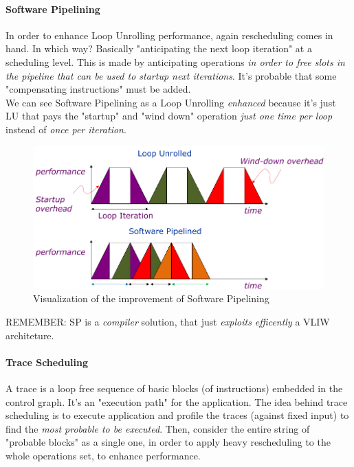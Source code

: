 \documentclass[10pt,a4paper]{article}
\begin{document}
					\paragraph{Software Pipelining}
						In order to enhance Loop Unrolling performance, again rescheduling comes in hand. In which way? Basically "anticipating the next loop iteration" at a scheduling level. This is made by anticipating operations \emph{in order to free slots in the pipeline that can be used to startup next iterations}. It's probable that some "compensating instructions" must be added.\\
						We can see Software Pipelining as a Loop Unrolling \emph{enhanced} because it's just LU that pays the "startup" and "wind down" operation \emph{just one time per loop} instead of \emph{once per iteration}.
						\begin{figure}[H]
							\centering
							\includegraphics[width = \textwidth]{./images/swpipe.png}
							\caption{Visualization of the improvement of Software Pipelining}
						\end{figure}
						REMEMBER: SP is a \emph{compiler} solution, that just \emph{exploits efficently} a VLIW architeture.
					
					\paragraph{Trace Scheduling}
						A trace is a loop free sequence of basic blocks (of instructions) embedded in the control graph. It's an "execution path" for the application. The idea behind trace scheduling is to execute application and profile the traces (against fixed input) to find the \emph{most probable to be executed}. Then, consider the entire string of "probable blocks" as a single one, in order to apply heavy rescheduling to the whole operations set, to enhance performance.
						
\end{document}
